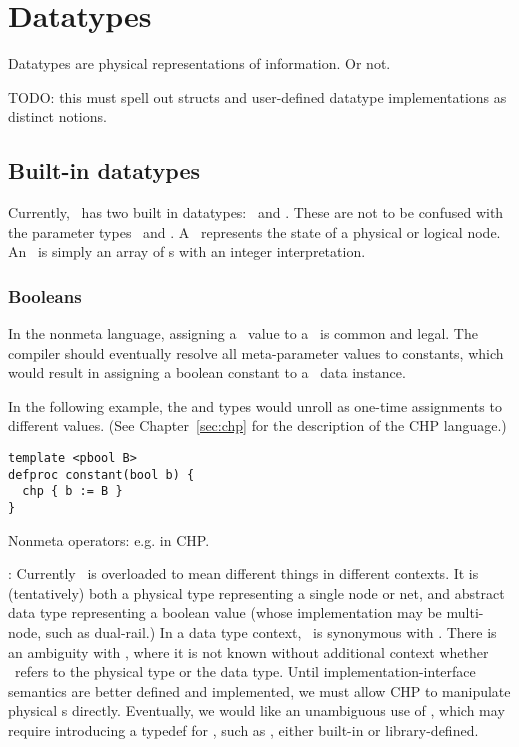 

\chapter{Datatypes}
\label{sec:datatypes}

Datatypes are physical representations of information.  
Or not.  

TODO: this must spell out structs and user-defined datatype implementations
as distinct notions.  


\section{Built-in datatypes}
\label{sec:datatypes:builtin}

Currently, \hac\ has two built in datatypes: \bool\ and \int.  
These are not to be confused with the parameter types \pbool\ and \pint.  
A \bool\ represents the state of a physical or logical node.  
An \int\ is simply an array of \bool{}s with an integer interpretation.  

\subsection{Booleans}
\label{sec:datatypes:builtin:bool}

In the nonmeta language, assigning a \pbool\ value to a \bool\ 
is common and legal.  
The compiler should eventually resolve all meta-parameter values to
constants, which would result in assigning a boolean constant
to a \bool\ data instance.  

In the following example, the  and
 types would unroll as one-time
assignments to different values.  
(See Chapter~\ref{sec:chp} for the description of the CHP language.)

\begin{verbatim}
template <pbool B>
defproc constant(bool b) {
  chp { b := B }
}
\end{verbatim}

Nonmeta operators: 
e.g. in CHP.  

: Currently \bool\ is overloaded to mean different things
in different contexts.  It is (tentatively) both a physical type
representing a single node or net, and abstract data type representing
a boolean value (whose implementation may be multi-node, such as dual-rail.)
In a data type context, \bool\ is synonymous with \ttt{int<1>}.  
There is an ambiguity with \ttt{defproc foo(bool b) \{...\}}, 
where it is not known without additional context whether \bool\ refers to 
the physical type or the data type.  
Until implementation-interface semantics are better defined and implemented, 
we must allow CHP to manipulate physical \bool{}s directly.  
Eventually, we would like an unambiguous use of \bool, which may require
introducing a typedef for \ttt{int<1>}, such as \ttt{dbool}, 
either built-in or library-defined.  

